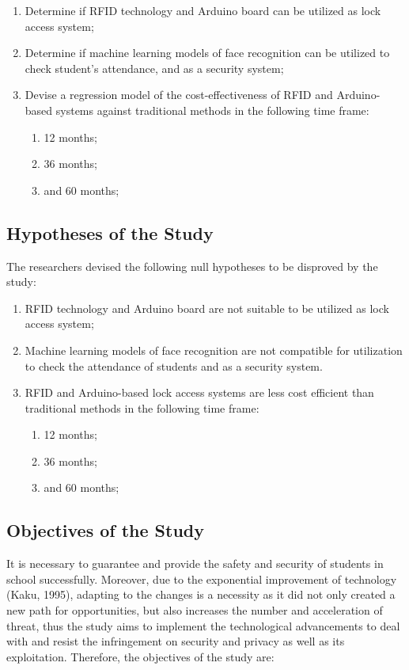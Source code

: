 \documentclass[12pt]{article}
\begin{document}
\begin{enumerate}
	\item Determine if RFID technology and Arduino board can be utilized as lock access system;
	\item Determine if machine learning models of face recognition can be utilized to check student's attendance, and as a security system;
	\item Devise a regression model of the cost-effectiveness of RFID and Arduino-based systems against traditional methods in the following time frame:
	\begin{enumerate}
		\item 12 months;
		\item 36 months;
		\item and 60 months;
	\end{enumerate}	
\end{enumerate}

\subsection*{Hypotheses of the Study\centering}

The researchers devised the following null hypotheses to be disproved by the study:

\begin{enumerate}
	\item RFID technology and Arduino board are not suitable to be utilized as lock access system;
	\item Machine learning models of face recognition are not compatible for utilization to check the attendance of students and as a security system.
	\item RFID and Arduino-based lock access systems are less cost efficient than traditional methods in the following time frame:
	\begin{enumerate}
		\item 12 months;
		\item 36 months;
		\item and 60 months;
	\end{enumerate}
\end{enumerate}

\subsection*{Objectives of the Study\centering}

It is necessary to guarantee and provide the safety and security of students in school successfully. Moreover, due to the exponential improvement of technology (Kaku, 1995), adapting to the changes is a necessity as it did not only created a new path for opportunities, but also increases the number and acceleration of threat, thus the study aims to implement the technological advancements to deal with and resist the infringement on security and privacy as well as its exploitation. Therefore, the objectives of the study are:
\end{document}
